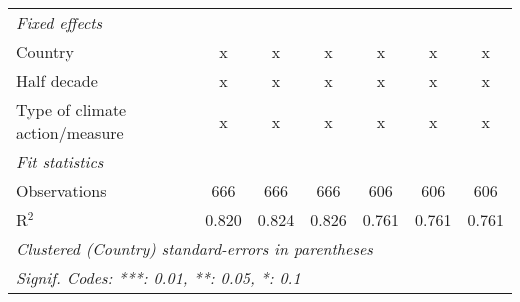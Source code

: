 \begin{tabular}{lcccccc}
   \emph{Fixed effects}\\
   Country                                                          & x       & x             & x             & x             & x             & x\\  
   Half decade                                                      & x       & x             & x             & x             & x             & x\\  
   Type of climate action/measure                                   & x       & x             & x             & x             & x             & x\\  
   \midrule \emph{Fit statistics}\\
   Observations                                                     & 666     & 666           & 666           & 606           & 606           & 606\\  
   R$^2$                                                            & 0.820   & 0.824         & 0.826         & 0.761         & 0.761         & 0.761\\  
   \midrule
   \multicolumn{7}{l}{\emph{Clustered (Country) standard-errors in parentheses}}\\
   \multicolumn{7}{l}{\emph{Signif. Codes: ***: 0.01, **: 0.05, *: 0.1}}\\
\end{tabular}
\par\endgroup



